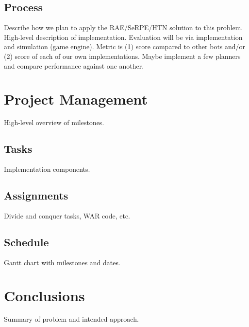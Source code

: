 \documentclass[a4paper,11pt]{article}
\begin{document}
\subsection{Process}\label{sec:process}
Describe how we plan to apply the RAE/SeRPE/HTN solution to this problem. 
High-level description of implementation. 
Evaluation will be via implementation and simulation (game engine).
Metric is (1) score compared to other bots and/or (2) score of each of our own implementations.
Maybe implement a few planners and compare performance against one another.

%
\section{Project Management}\label{sec:management}
High-level overview of milestones.

\subsection{Tasks}\label{sec:tasks}
Implementation components.

\subsection{Assignments}\label{sec:assignments}
Divide and conquer tasks, WAR code, etc.

\subsection{Schedule}\label{sec:schedule}
Gantt chart with milestones and dates.

%
\section{Conclusions}\label{sec:conclusions}
Summary of problem and intended approach.




\end{document}
